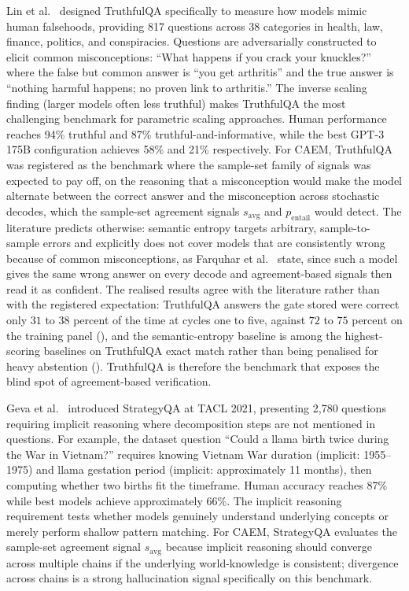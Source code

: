 Lin et al.~\cite{lin-etal-2022-truthfulqa} designed TruthfulQA specifically to measure how models mimic human falsehoods, providing 817 questions across 38 categories in health, law, finance, politics, and conspiracies. Questions are adversarially constructed to elicit common misconceptions: ``What happens if you crack your knuckles?'' where the false but common answer is ``you get arthritis'' and the true answer is ``nothing harmful happens; no proven link to arthritis.'' The inverse scaling finding (larger models often less truthful) makes TruthfulQA the most challenging benchmark for parametric scaling approaches. Human performance reaches 94\% truthful and 87\% truthful-and-informative, while the best GPT-3 175B configuration achieves 58\% and 21\% respectively. For CAEM, TruthfulQA was registered as the benchmark where the sample-set family of signals was expected to pay off, on the reasoning that a misconception would make the model alternate between the correct answer and the misconception across stochastic decodes, which the sample-set agreement signals $s_{\text{avg}}$ and $p_{\text{entail}}$ would detect. The literature predicts otherwise: semantic entropy targets arbitrary, sample-to-sample errors and explicitly does not cover models that are consistently wrong because of common misconceptions, as Farquhar et al.~\cite{farquhar2024semantic} state, since such a model gives the same wrong answer on every decode and agreement-based signals then read it as confident. The realised results agree with the literature rather than with the registered expectation: TruthfulQA answers the gate stored were correct only $31$ to $38$ percent of the time at cycles one to five, against $72$ to $75$ percent on the training panel (), and the semantic-entropy baseline is among the highest-scoring baselines on TruthfulQA exact match rather than being penalised for heavy abstention (). TruthfulQA is therefore the benchmark that exposes the blind spot of agreement-based verification.

Geva et al.~\cite{10.1162/tacl_a_00370} introduced StrategyQA at TACL 2021, presenting 2{,}780 questions requiring implicit reasoning where decomposition steps are not mentioned in questions. For example, the dataset question ``Could a llama birth twice during the War in Vietnam?'' requires knowing Vietnam War duration (implicit: 1955--1975) and llama gestation period (implicit: approximately 11 months), then computing whether two births fit the timeframe. Human accuracy reaches 87\% while best models achieve approximately 66\%. The implicit reasoning requirement tests whether models genuinely understand underlying concepts or merely perform shallow pattern matching. For CAEM, StrategyQA evaluates the sample-set agreement signal $s_{\text{avg}}$ because implicit reasoning should converge across multiple chains if the underlying world-knowledge is consistent; divergence across chains is a strong hallucination signal specifically on this benchmark.

